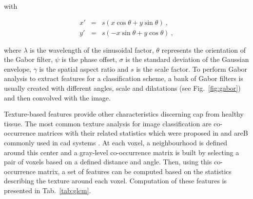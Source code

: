 \noindent with 

\begin{eqnarray}
	x' & = & s\left( x \cos \theta + y \sin \theta \right) \ , \nonumber \\
	y' & = & s \left( - x \sin \theta + y \cos \theta \right) \ , \nonumber
\end{eqnarray}

\noindent where $\lambda$ is the wavelength of the sinusoidal factor, $\theta$ represents the orientation of the Gabor filter, $\psi$ is the phase offset, $\sigma$ is the standard deviation of the Gaussian envelope, $\gamma$ is the spatial aspect ratio and $s$ is the scale factor.
To perform Gabor analysis to extract features for a classification scheme, a bank of Gabor filters is usually created with different angles, scale and dilatations (see Fig.~\ref{fig:gabor}) and then convolved with the image. 

Texture-based features provide other characteristics discerning \ac{cap} from healthy tissue.
The most common texture analysis for image classification are co-occurrence matrices with their related statistics which were proposed in \cite{Haralick1973} and areB commonly used in \ac{cad} systems \cite{Antic2013,Niaf2011,Niaf2012,Tiwari2009a,Tiwari2010,Tiwari2013,Viswanath2008,Viswanath2008a,Viswanath2011,Viswanath2012}.
At each voxel, a neighbourhood is defined around this center and a gray-level co-occurrence matrix is built by selecting a pair of voxels based on a defined distance and angle.
Then, using this co-occurrence matrix, a set of features can be computed based on the statistics describing the texture around each voxel.
Computation of these features is presented in Tab.~\ref{tab:glcm}.

